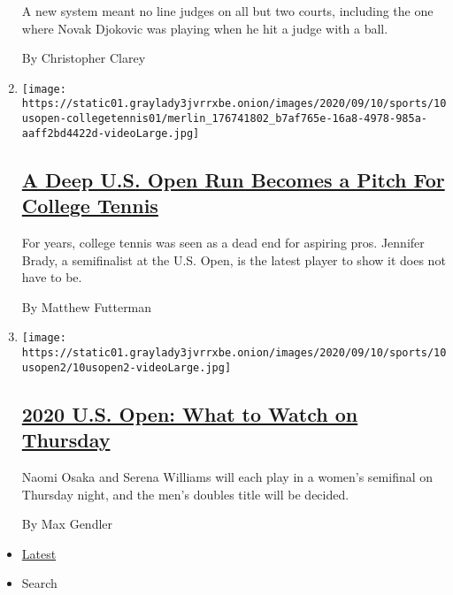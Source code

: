 \begin{enumerate}
  A new system meant no line judges on all but two courts, including the
  one where Novak Djokovic was playing when he hit a judge with a ball.

  By Christopher Clarey
\item
  \texttt{[image: https://static01.graylady3jvrrxbe.onion/images/2020/09/10/sports/10usopen-collegetennis01/merlin\_176741802\_b7af765e-16a8-4978-985a-aaff2bd4422d-videoLarge.jpg]}

  \hypertarget{a-deep-us-open-run-becomes-a-pitch-for-college-tennis}{%
  \subsection{\texorpdfstring{\href{/2020/09/10/sports/tennis/jennifer-brady-us-open.html}{A
  Deep U.S. Open Run Becomes a Pitch For College
  Tennis}}{A Deep U.S. Open Run Becomes a Pitch For College Tennis}}\label{a-deep-us-open-run-becomes-a-pitch-for-college-tennis}}

  For years, college tennis was seen as a dead end for aspiring pros.
  Jennifer Brady, a semifinalist at the U.S. Open, is the latest player
  to show it does not have to be.

  By Matthew Futterman
\item
  \texttt{[image: https://static01.graylady3jvrrxbe.onion/images/2020/09/10/sports/10usopen2/10usopen2-videoLarge.jpg]}

  \hypertarget{2020-us-open-what-to-watch-on-thursday}{%
  \subsection{\texorpdfstring{\href{/2020/09/10/sports/tennis/2020-us-open-what-to-watch.html}{2020
  U.S. Open: What to Watch on
  Thursday}}{2020 U.S. Open: What to Watch on Thursday}}\label{2020-us-open-what-to-watch-on-thursday}}

  Naomi Osaka and Serena Williams will each play in a women's semifinal
  on Thursday night, and the men's doubles title will be decided.

  By Max Gendler
\end{enumerate}

\begin{itemize}
\tightlist
\item
  \protect\hyperlink{stream-panel}{Latest}
\item
  Search
\end{itemize}

